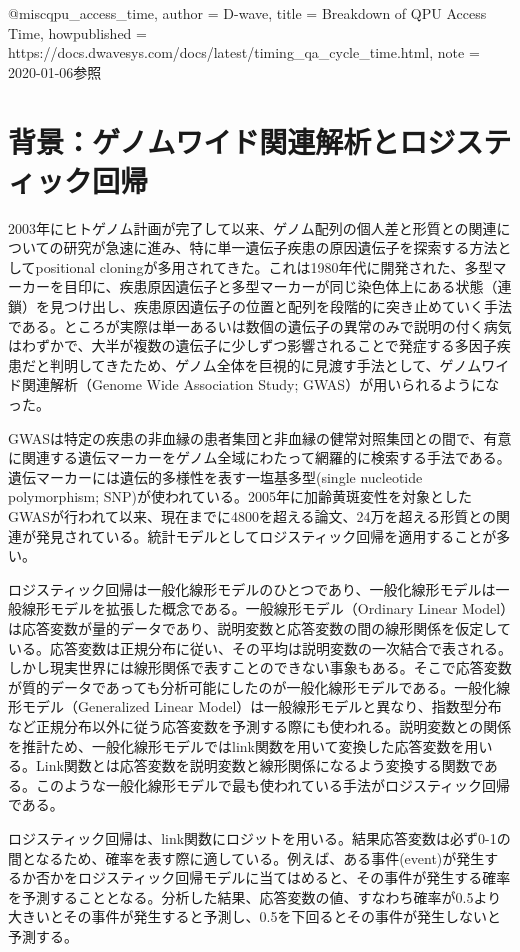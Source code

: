 @misc{qpu_access_time,
	author = {D-wave},
	title = {Breakdown of QPU Access Time},
	howpublished = {https://docs.dwavesys.com/docs/latest/timing_qa_cycle_time.html},
	note = {2020-01-06参照}
}

\section{背景：ゲノムワイド関連解析とロジスティック回帰}
2003年にヒトゲノム計画が完了して以来、ゲノム配列の個人差と形質との関連についての研究が急速に進み、特に単一遺伝子疾患の原因遺伝子を探索する方法としてpositional cloningが多用されてきた。これは1980年代に開発された、多型マーカーを目印に、疾患原因遺伝子と多型マーカーが同じ染色体上にある状態（連鎖）を見つけ出し、疾患原因遺伝子の位置と配列を段階的に突き止めていく手法である\cite{yano2016genome}。ところが実際は単一あるいは数個の遺伝子の異常のみで説明の付く病気はわずかで、大半が複数の遺伝子に少しずつ影響されることで発症する多因子疾患だと判明してきたため、ゲノム全体を巨視的に見渡す手法として、ゲノムワイド関連解析（Genome Wide Association Study; GWAS）が用いられるようになった。

GWASは特定の疾患の非血縁の患者集団と非血縁の健常対照集団との間で、有意に関連する遺伝マーカーをゲノム全域にわたって網羅的に検索する手法である\cite{yano2016genome}。遺伝マーカーには遺伝的多様性を表す一塩基多型(single nucleotide polymorphism; SNP)が使われている。2005年に加齢黄斑変性を対象としたGWASが行われて以来、現在までに4800を超える論文、24万を超える形質との関連が発見されている\cite{gwasCatalog}。統計モデルとしてロジスティック回帰を適用することが多い\cite{duverle2015privacy}。

ロジスティック回帰は一般化線形モデルのひとつであり、一般化線形モデルは一般線形モデルを拡張した概念である。一般線形モデル（Ordinary Linear Model）は応答変数が量的データであり、説明変数と応答変数の間の線形関係を仮定している。応答変数は正規分布に従い、その平均は説明変数の一次結合で表される。しかし現実世界には線形関係で表すことのできない事象もある。そこで応答変数が質的データであっても分析可能にしたのが一般化線形モデルである。一般化線形モデル（Generalized Linear Model）は一般線形モデルと異なり、指数型分布など正規分布以外に従う応答変数を予測する際にも使われる。説明変数との関係を推計ため、一般化線形モデルではlink関数を用いて変換した応答変数を用いる。Link関数とは応答変数を説明変数と線形関係になるよう変換する関数である。このような一般化線形モデルで最も使われている手法がロジスティック回帰である。

ロジスティック回帰は、link関数にロジットを用いる。結果応答変数は必ず0-1の間となるため、確率を表す際に適している。例えば、ある事件(event)が発生するか否かをロジスティック回帰モデルに当てはめると、その事件が発生する確率を予測することとなる。分析した結果、応答変数の値、すなわち確率が0.5より大きいとその事件が発生すると予測し、0.5を下回るとその事件が発生しないと予測する。

